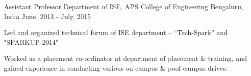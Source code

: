 \begin{cventries}
  \cventry
    {Assistant Professor} %
    {Department of ISE, APS College of Engineering} %
    {Bengaluru, India} %
    {June. 2013 - July. 2015} %
    {
      \begin{cvitems} %
        \item {Led and organized technical forum of ISE department – “Tech-Spark” and "SPARKUP-2014"}
        \item {Worked as a placement co-ordinator at department of placement \& training, and gained experience in conducting various on campus \& pool campus drives.}
      \end{cvitems}
    }

\end{cventries}
